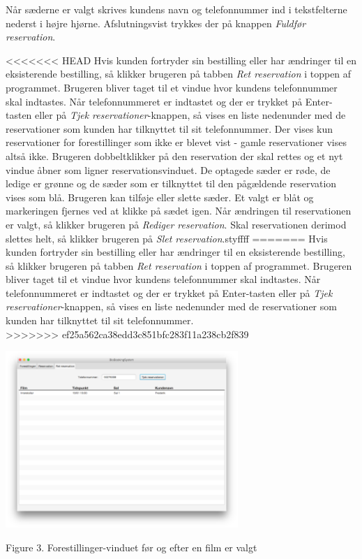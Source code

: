 \documentclass[final]{rapport1}
\begin{document}
Når sæderne er valgt skrives kundens navn og telefonnummer ind i tekstfelterne nederst i højre hjørne. Afslutningsvist trykkes der på knappen \emph{Fuldfør reservation}. 

<<<<<<< HEAD
Hvis kunden fortryder sin bestilling eller har ændringer til en eksisterende bestilling, så klikker brugeren på tabben \emph{Ret reservation} i toppen af programmet. Brugeren bliver taget til et vindue hvor kundens telefonnummer skal indtastes. Når telefonnummeret er indtastet og der er trykket på Enter-tasten eller på \emph{Tjek reservationer}-knappen, så vises en liste nedenunder med de reservationer som kunden har tilknyttet til sit telefonnummer. Der vises kun reservationer for forestillinger som ikke er blevet vist - gamle reservationer vises altså ikke. Brugeren dobbeltklikker på den reservation der skal rettes og et nyt vindue åbner som ligner reservationsvinduet. De optagede sæder er røde, de ledige er grønne og de sæder som er tilknyttet til den pågældende reservation vises som blå. Brugeren kan tilføje eller slette sæder. Et valgt er blåt og markeringen fjernes ved at klikke på sædet igen. Når ændringen til reservationen er valgt, så klikker brugeren på \emph{Rediger reservation}. Skal reservationen derimod slettes helt, så klikker brugeren på \emph{Slet reservation}.styffff
=======
Hvis kunden fortryder sin bestilling eller har ændringer til en eksisterende bestilling, så klikker brugeren på tabben \emph{Ret reservation} i toppen af programmet. Brugeren bliver taget til et vindue hvor kundens telefonnummer skal indtastes. Når telefonnummeret er indtastet og der er trykket på Enter-tasten eller på \emph{Tjek reservationer}-knappen, så vises en liste nedenunder med de reservationer som kunden har tilknyttet til sit telefonnummer. \\
>>>>>>> ef25a562ca38edd3c851bfc283f11a238cb2f839

\begin{picture}

\includegraphics[width=250pt]{4.png}

\end{picture}
\begin{center}
\tiny Figure 3. Forestillinger-vinduet før og efter en film er valgt
\end{center}
\end{document}
